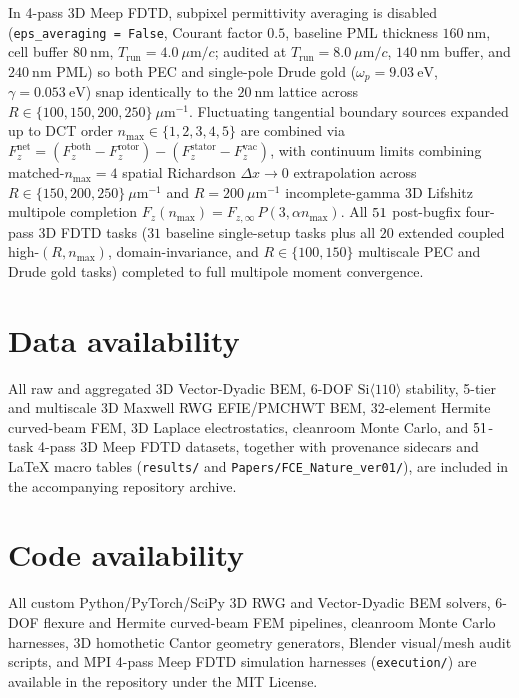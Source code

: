 \documentclass[pdflatex,sn-nature]{sn-jnl}
\begin{document}
In 4-pass 3D Meep FDTD\cite{rodriguez2009pra,oskooi2010}, subpixel permittivity averaging is disabled (\texttt{eps\_averaging = False}, Courant factor $0.5$, baseline PML thickness $160\ \mathrm{nm}$, cell buffer $80\ \mathrm{nm}$, $T_{\mathrm{run}} = 4.0\ \mu\mathrm{m}/c$; audited at $T_{\mathrm{run}} = 8.0\ \mu\mathrm{m}/c$, $140\ \mathrm{nm}$ buffer, and $240\ \mathrm{nm}$ PML) so both PEC and single-pole Drude gold ($\omega_p = 9.03\ \mathrm{eV}$, $\gamma = 0.053\ \mathrm{eV}$) snap identically to the $20\ \mathrm{nm}$ lattice across $R \in \{100,150,200,250\}\ \mu\mathrm{m}^{-1}$. Fluctuating tangential boundary sources expanded up to DCT order $n_{\max} \in \{1,2,3,4,5\}$ are combined via $F_z^{\mathrm{net}} = (F_z^{\mathrm{both}} - F_z^{\mathrm{rotor}}) - (F_z^{\mathrm{stator}} - F_z^{\mathrm{vac}})$, with continuum limits combining matched-$n_{\max}=4$ spatial Richardson $\Delta x \to 0$ extrapolation across $R \in \{150,200,250\}\ \mu\mathrm{m}^{-1}$ and $R=200\ \mu\mathrm{m}^{-1}$ incomplete-gamma 3D Lifshitz multipole completion $F_z(n_{\max}) = F_{z,\infty}\,P(3,\alpha n_{\max})$. All $51{}$ post-bugfix four-pass 3D FDTD tasks ($31$ baseline single-setup tasks plus all $20$ extended coupled high-$(R,n_{\max})$, domain-invariance, and $R \in \{100,150\}$ multiscale PEC and Drude gold tasks) completed to full multipole moment convergence.

\section*{Data availability}
All raw and aggregated 3D Vector-Dyadic BEM, 6-DOF $\mathrm{Si}\langle 110\rangle$ stability, 5-tier and multiscale 3D Maxwell RWG EFIE/PMCHWT BEM, 32-element Hermite curved-beam FEM, 3D Laplace electrostatics, cleanroom Monte Carlo, and $51{}$-task 4-pass 3D Meep FDTD datasets, together with provenance sidecars and LaTeX macro tables (\texttt{results/} and \texttt{Papers/FCE\_Nature\_ver01/}), are included in the accompanying repository archive.

\section*{Code availability}
All custom Python/PyTorch/SciPy 3D RWG and Vector-Dyadic BEM solvers, 6-DOF flexure and Hermite curved-beam FEM pipelines, cleanroom Monte Carlo harnesses, 3D homothetic Cantor geometry generators, Blender visual/mesh audit scripts, and MPI 4-pass Meep FDTD simulation harnesses (\texttt{execution/}) are available in the repository under the MIT License.
\end{document}
